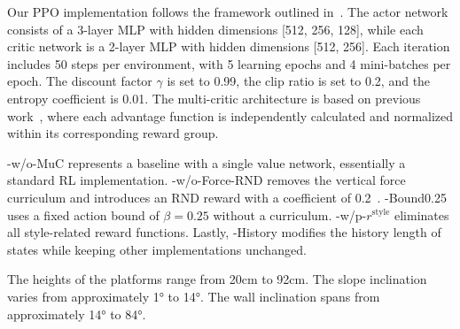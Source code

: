  Our PPO implementation follows the framework outlined in~\cite{Rudin2021LearningTW}. The actor network consists of a 3-layer MLP with hidden dimensions [512, 256, 128], while each critic network is a 2-layer MLP with hidden dimensions [512, 256]. Each iteration includes 50 steps per environment, with 5 learning epochs and 4 mini-batches per epoch. The discount factor $\gamma$ is set to 0.99, the clip ratio is set to 0.2, and the entropy coefficient is 0.01. The multi-critic architecture is based on previous work~\cite{mysore2022multi}, where each advantage function is independently calculated and normalized within its corresponding reward group.

 \ours-w/o-MuC represents a baseline with a single value network, essentially a standard RL implementation. \ours-w/o-Force-RND removes the vertical force curriculum and introduces an RND reward with a coefficient of 0.2~\cite{burda2019exploration}. \ours-Bound0.25 uses a fixed action bound of $\beta = 0.25$ without a curriculum. \ours-w/p-$r^{\mathrm{style}}$ eliminates all style-related reward functions. 
Lastly, \ours-History modifies the history length of states while keeping other implementations unchanged.

 The heights of the platforms range from 20cm to 92cm. The slope inclination varies from approximately 1° to 14°. The wall inclination spans from approximately 14° to 84°.


